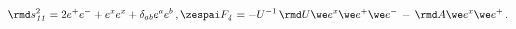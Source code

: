 \begin{equation} \label{flat}
\rmd s^2_{\it 11}=2 e^+ e^- + e^x e^x + \delta_{ab}e^a e^b  \,, \zespai
F_{\it 4}=-U^{-1} \, \rmd U\we e^x \we e^+ \we e^- \, -\, \rmd A \we e^x
\we e^+ \,.
\end{equation}

